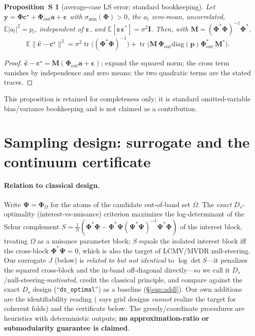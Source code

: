 \documentclass[10pt]{article}
\newtheorem{proposition}{Proposition~S}
\DeclareMathOperator{\tr}{tr}
\newcommand{\Phimat}{\bm{\Phi}}
\newcommand{\Psimat}{\bm{\Psi}}
\newcommand{\norm}[1]{\lVert#1\rVert}
\begin{document}
\begin{proposition}[average-case LS error; standard bookkeeping]
Let $\bm y=\Phimat\bm c^\star+\Phimat_{\mathrm{out}}\bm a+\bm\varepsilon$ with
$\sigma_{\min}(\Phimat)>0$, the $a_l$ zero-mean, uncorrelated, $\mathbb E|a_l|^2=p_l$,
independent of $\bm\varepsilon$, and
$\mathbb E[\bm\varepsilon\bm\varepsilon^{*}]=\sigma^2\bm I$.  Then, with
$\bm M=(\Phimat^{*}\Phimat)^{-1}\Phimat^{*}$,
\[
\mathbb E\norm{\hat{\bm c}-\bm c^\star}^2
=\sigma^2\tr\!\big((\Phimat^{*}\Phimat)^{-1}\big)
+\tr\!\big(\bm M\,\Phimat_{\mathrm{out}}\mathrm{diag}(\bm p)\Phimat_{\mathrm{out}}^{*}\,
\bm M^{*}\big).
\]
\end{proposition}
\begin{proof}
$\hat{\bm c}-\bm c^\star=\bm M(\Phimat_{\mathrm{out}}\bm a+\bm\varepsilon)$; expand the
squared norm; the cross term vanishes by independence and zero means; the two quadratic
terms are the stated traces.
\end{proof}
This proposition is retained for completeness only; it is standard omitted-variable
bias/variance bookkeeping and is not claimed as a contribution.

\section{Sampling design: surrogate and the continuum certificate}\label{sup:design}\label{sec:design}

\paragraph{Relation to classical design.}  Write $\Psimat=\Phimat_{\Omega}$ for the atoms
of the candidate out-of-band set $\Omega$.  The \emph{exact} $D_s$-optimality
(interest-vs-nuisance) criterion maximizes the log-determinant of the Schur complement
$S=\tfrac1N(\Phimat^{*}\Phimat-\Phimat^{*}\Psimat(\Psimat^{*}\Psimat)^{-1}\Psimat^{*}\Phimat)$
of the interest block, treating $\Omega$ as a nuisance parameter block; $S$ equals the
isolated interest block iff the cross-block $\Phimat^{*}\Psimat=0$, which is also the target
of LCMV/MVDR null-steering.  Our surrogate $J$ (below) is \emph{related to but not
identical} to $\log\det S$---it penalizes the squared cross-block and the in-band
off-diagonal directly---so we call it $D_s$/null-steering-\emph{motivated}, credit the
classical principle, and compare against the exact $D_s$ design (``\texttt{ds\_optimal}'')
as a baseline (\S\ref{sup:addl}).  Our own additions are the identifiability reading
(\MThmGrid{} says grid designs \emph{cannot} realize the target for coherent folds) and
the certificate below.  The greedy/coordinate procedures are heuristics with deterministic
outputs; \textbf{no approximation-ratio or submodularity guarantee is claimed}.
\end{document}
